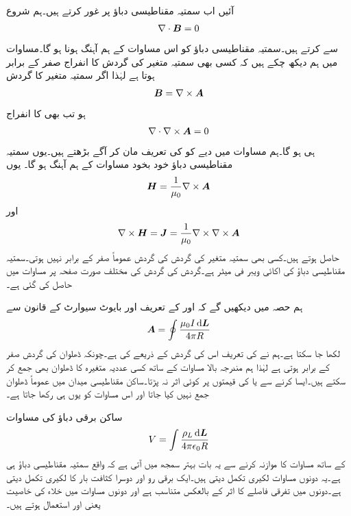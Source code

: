 آئیں اب سمتیہ مقناطیسی دباؤ پر غور کرتے ہیں۔ہم شروع
\begin{align}\label{مساوات_مقناطیسی_پھیلاو_بہاو_صفر_ہے}
\nabla \cdot {\ensuremath{{\boldsymbol{B}}}}=0
\end{align}
سے کرتے ہیں۔سمتیہ مقناطیسی دباؤ کو اس مساوات کے ہم آہنگ ہونا ہو گا۔مساوات  میں ہم دیکھ چکے ہیں کہ کسی بھی سمتیہ متغیر کی گردش کا انفراج صفر کے برابر ہوتا ہے لہٰذا اگر  سمتیہ متغیر   کا گردش
\begin{align}\label{مساوات_مقناطیسی_سمتی_دباو_تعریف}
{\ensuremath{{\boldsymbol{B}}}}=\nabla \times {\ensuremath{{\boldsymbol{A}}}}
\end{align}
 ہو تب بھی  کا انفراج
\begin{align*}
\nabla \cdot \nabla \times {\ensuremath{{\boldsymbol{A}}}}=0
\end{align*}
ہی ہو گا۔ہم مساوات  میں دیے  کو  کی تعریف مان کر آگے بڑھتے ہیں۔یوں سمتیہ مقناطیسی دباؤ خود بخود مساوات  کے ہم آہنگ ہو گا۔  یوں
\begin{align*}
{\ensuremath{{\boldsymbol{H}}}}=\frac{1}{\mu_0} \nabla \times {\ensuremath{{\boldsymbol{A}}}}
\end{align*}
اور
\begin{align*}
\nabla \times {\ensuremath{{\boldsymbol{H}}}}={{\boldsymbol{J}}}=\frac{1}{\mu_0} \nabla \times \nabla \times {\ensuremath{{\boldsymbol{A}}}}
\end{align*}
حاصل ہوتے ہیں۔کسی بھی سمتیہ متغیر کی گردش کی گردش عموماً صفر کے برابر نہیں ہوتی۔سمتیہ مقناطیسی دباؤ  کی اکائی ویبر فی میٹر  ہے۔گردش کی گردش کی  مختلف صورت صفحہ  پر مساوات  میں حاصل کی گئی ہے۔

ہم حصہ  میں دیکھیں گے کہ  اور  کے تعریف اور بایوٹ سیوارٹ کے قانون سے
\begin{align}\label{مساوات_مقناطیسی_سمتی_دباو}
\kvec{A}=\oint \frac{\mu_0 I \dif \kvec{L}}{4\pi R}
\end{align}
لکھا جا سکتا ہے۔ہم نے  کی تعریف اس کی گردش کے ذریعے کی ہے۔چونکہ ڈھلوان کی گردش صفر کے برابر ہوتی ہے  لہٰذا ہم مندرجہ بالا مساوات کے ساتھ کسی عددیہ متغیرہ کا ڈھلوان بھی جمع کر سکتے ہیں۔ایسا کرنے سے  یا  کی قیمتوں پر کوئی اثر نہ پڑتا۔ساکن مقناطیسی میدان میں عموماً ڈھلوان جمع نہیں کیا جاتا اور اس مساوات کو یوں ہی رکھا جاتا ہے۔

ساکن برقی دباؤ کی مساوات
\begin{align*}
V=\int \frac{\rho_L \dif \kvec{L}}{4\pi \epsilon_0 R}
\end{align*}
کے ساتھ مساوات کا موازنہ کرنے سے یہ بات بہتر سمجھ میں آتی ہے کہ  واقع سمتیہ مقناطیسی دباؤ ہی ہے۔یہ دونوں مساوات لکیری تکمل دیتی ہیں۔ایک برقی رو اور دوسرا کثافت بار کا لکیری تکمل دیتی ہے۔دونوں میں تفرقی فاصلے  کا اثر  کے بالعکس متناسب ہے اور دونوں مساوات میں خلاء کی خاصیت یعنی  اور  استعمال ہوتے ہیں۔

